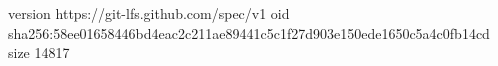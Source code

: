 version https://git-lfs.github.com/spec/v1
oid sha256:58ee01658446bd4eac2c211ae89441c5c1f27d903e150ede1650c5a4c0fb14cd
size 14817
